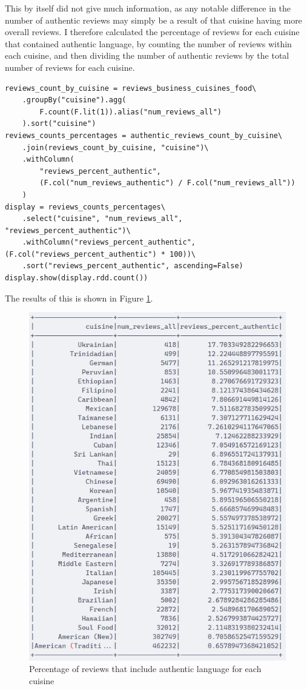 This by itself did not give much information, as any notable difference in the number of authentic reviews may simply be a result of that cuisine having more overall reviews. I therefore calculated the percentage of reviews for each cuisine that contained authentic language, by counting the number of reviews within each cuisine, and then dividing the number of authentic reviews by the total number of reviews for each cuisine. 

\begin{verbatim}
reviews_count_by_cuisine = reviews_business_cuisines_food\
    .groupBy("cuisine").agg(
        F.count(F.lit(1)).alias("num_reviews_all")
    ).sort("cuisine")
reviews_counts_percentages = authentic_reviews_count_by_cuisine\
    .join(reviews_count_by_cuisine, "cuisine")\
    .withColumn(
        "reviews_percent_authentic",
        (F.col("num_reviews_authentic") / F.col("num_reviews_all"))
    )
display = reviews_counts_percentages\
    .select("cuisine", "num_reviews_all", "reviews_percent_authentic")\
    .withColumn("reviews_percent_authentic", (F.col("reviews_percent_authentic") * 100))\
    .sort("reviews_percent_authentic", ascending=False)
display.show(display.rdd.count())
\end{verbatim}

The results of this is shown in Figure \ref{fig:auth_cuisines_percent}.

\begin{figure}
    \centering
    \includegraphics[width=0.5\linewidth]{images/auth_reviews_percent.png}
    \caption{Percentage of reviews that include authentic language for each cuisine}
    \label{fig:auth_cuisines_percent}
\end{figure}

